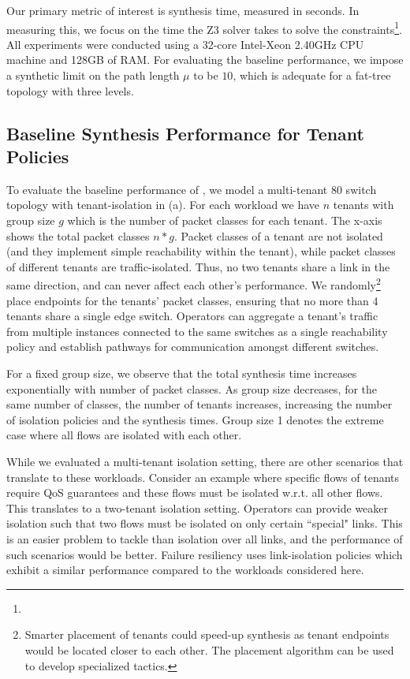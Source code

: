 Our primary metric of interest is synthesis time, measured in
seconds. In measuring this, we focus on the time the Z3 solver takes
to solve the constraints\footnote{}. 
All experiments were conducted using a
32-core Intel-Xeon 2.40GHz CPU machine and
128GB of RAM. For evaluating the baseline performance, we impose a
synthetic limit on the path length $\mu$ to be $10$, which is adequate 
for a fat-tree topology with three levels. 

\subsection{Baseline Synthesis Performance for Tenant Policies} \label{sec:baselineeval} 
 To evaluate the baseline
performance of \Name, we model a multi-tenant 80 switch
 topology with tenant-isolation in
(a).  For each workload we have $n$ tenants with
group size $g$ which is the number of packet classes for each
tenant. The x-axis shows the total packet classes $n*g$.  Packet
classes of a tenant are not isolated (and they implement simple
reachability within the tenant), while packet classes of different
tenants are traffic-isolated. Thus, no two tenants share a link in
the same direction, and can never
affect each other's performance.  We randomly\footnote{ Smarter
  placement of tenants could speed-up synthesis as tenant endpoints
  would be located closer to each other. The placement algorithm can
  be used to develop specialized tactics.}  place endpoints for the
tenants' packet classes, ensuring that no more than 4 tenants share a
single edge switch.  Operators can aggregate a tenant's traffic from
multiple instances connected to the same switches 
as a single reachability policy and establish
pathways for communication amongst different switches.

For a fixed group size, we observe that the total synthesis time
increases exponentially with number of packet classes.  As
 group size decreases, for the same number of classes, the 
number of tenants increases, increasing the number of isolation policies
and the synthesis times. 
Group size 1 denotes the
extreme case where all flows are isolated with each other.
 
While we evaluated a multi-tenant isolation setting, there are other
scenarios that translate to these workloads. Consider an example where
specific flows of tenants require QoS guarantees and these flows must
be isolated w.r.t. all other flows. This translates to a two-tenant
isolation setting. Operators can provide weaker isolation such that
two flows must be isolated on only certain ``special" links. 
This is an easier problem to tackle than isolation over all
links, and the performance of such scenarios would be better. 
Failure resiliency uses link-isolation policies which exhibit a similar
performance compared to the workloads considered here. 


